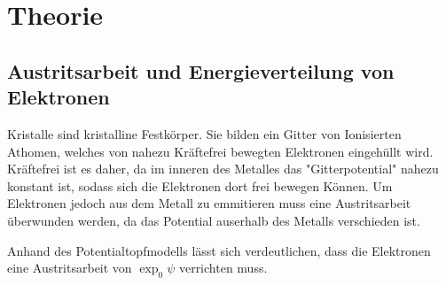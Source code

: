 \section{Theorie}
\label{sec:Theorie}
\subsection{Austritsarbeit und Energieverteilung von Elektronen}
Kristalle sind kristalline Festkörper. Sie bilden ein Gitter von 
Ionisierten Athomen, welches von nahezu Kräftefrei bewegten Elektronen 
eingehüllt wird. Kräftefrei ist es daher, da im inneren des Metalles das "Gitterpotential"
nahezu konstant ist, sodass sich die Elektronen dort frei bewegen Können. Um Elektronen jedoch 
aus dem Metall zu emmitieren muss eine Austritsarbeit überwunden werden, da das Potential auserhalb 
des Metalls verschieden ist.

Anhand des Potentialtopfmodells lässt sich verdeutlichen, dass die Elektronen eine Austritsarbeit von 
$\exp _0 \psi$ verrichten muss.


\cite{sample}
